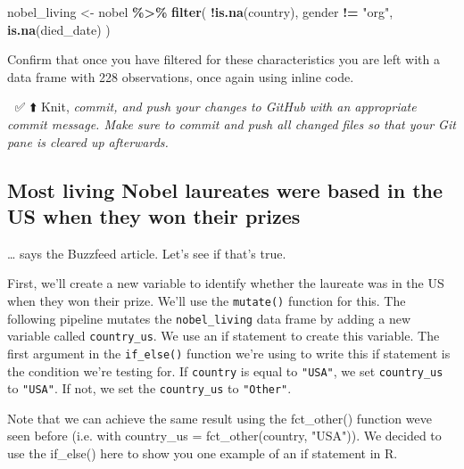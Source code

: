 \documentclass[
]{article}
\newenvironment{Shaded}{\begin{snugshade}}{\end{snugshade}}
\newcommand{\FunctionTok}[1]{\textcolor[rgb]{0.13,0.29,0.53}{\textbf{#1}}}
\newcommand{\NormalTok}[1]{#1}
\newcommand{\OtherTok}[1]{\textcolor[rgb]{0.56,0.35,0.01}{#1}}
\newcommand{\SpecialCharTok}[1]{\textcolor[rgb]{0.81,0.36,0.00}{\textbf{#1}}}
\newcommand{\StringTok}[1]{\textcolor[rgb]{0.31,0.60,0.02}{#1}}
\begin{document}
\begin{Shaded}
\begin{Highlighting}[]
\NormalTok{nobel\_living }\OtherTok{\textless{}{-}}\NormalTok{ nobel }\SpecialCharTok{\%\textgreater{}\%}
  \FunctionTok{filter}\NormalTok{(}
    \SpecialCharTok{!}\FunctionTok{is.na}\NormalTok{(country),}
\NormalTok{    gender }\SpecialCharTok{!=} \StringTok{"org"}\NormalTok{,}
    \FunctionTok{is.na}\NormalTok{(died\_date)}
\NormalTok{  )}
\end{Highlighting}
\end{Shaded}

Confirm that once you have filtered for these characteristics you are
left with a data frame with 228 observations, once again using inline
code.

🧶 ✅ ⬆️ Knit, \emph{commit, and push your changes to GitHub with an
appropriate commit message. Make sure to commit and push all changed
files so that your Git pane is cleared up afterwards.}

\subsection{Most living Nobel laureates were based in the US when they
won their
prizes}\label{most-living-nobel-laureates-were-based-in-the-us-when-they-won-their-prizes}

\ldots{} says the Buzzfeed article. Let's see if that's true.

First, we'll create a new variable to identify whether the laureate was
in the US when they won their prize. We'll use the \texttt{mutate()}
function for this. The following pipeline mutates the
\texttt{nobel\_living} data frame by adding a new variable called
\texttt{country\_us}. We use an if statement to create this variable.
The first argument in the \texttt{if\_else()} function we're using to
write this if statement is the condition we're testing for. If
\texttt{country} is equal to \texttt{"USA"}, we set \texttt{country\_us}
to \texttt{"USA"}. If not, we set the \texttt{country\_us} to
\texttt{"Other"}.

\begin{Shaded}
\begin{Highlighting}[]
\NormalTok{Note that we can achieve the same result using the \textasciigrave{}fct\_other()\textasciigrave{} function we\textquotesingle{}ve seen before (i.e. with \textasciigrave{}country\_us = fct\_other(country, "USA")\textasciigrave{}). We decided to use the \textasciigrave{}if\_else()\textasciigrave{} here to show you one example of an if statement in R.}
\end{Highlighting}
\end{Shaded}
\end{document}
